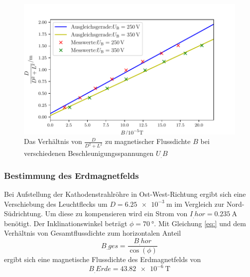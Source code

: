 \begin{figure}
\centering
\includegraphics[width=\linewidth-70pt,height=\textheight-70pt,keepaspectratio]{content/images/GraphMag1.pdf}
\caption{Das Verhältnis von $\frac{D}{D^2+L^2}$ zu magnetischer Flussdichte $B$ bei verschiedenen Beschleunigungsspannungen $U_.B$}\label{fig:Mag}
\end{figure}
\subsubsection{Bestimmung des Erdmagnetfelds}
Bei Aufstellung der Kathodenstrahlröhre in Ost-West-Richtung ergibt sich eine Verschiebung des Leuchtflecks um $D=\SI{6,25e-3}{\metre}$ im Vergleich zur Nord-Südrichtung.
Um diese zu kompensieren wird ein Strom von $I_.{hor}=\SI{0,235}{\ampere}$ benötigt. Der Inklinationswinkel beträgt $\phi=\SI{70}{\degree}$. Mit Gleichung \eqref{eq:}
und dem Verhältnis von Gesamtflussdichte zum horizontalen Anteil
\[
B_.{ges}= \frac{B_.{hor}}{\cos(\phi)}
\]
ergibt sich eine magnetische Flussdichte des Erdmagnetfelds von
\[
B_.{Erde}=\SI{43,82e-6}{\tesla}
\]
